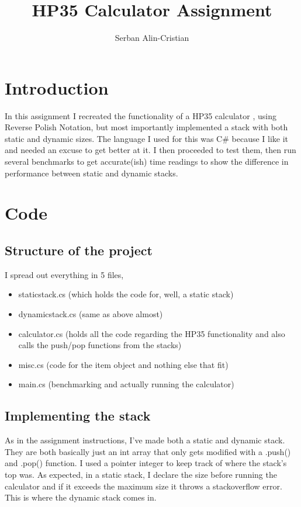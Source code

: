 \documentclass{article}
\title{HP35 Calculator Assignment}
\author{Serban Alin-Cristian}
\begin{document}
\maketitle



\section{Introduction}

In this assignment I recreated the functionality of a HP35 calculator , using Reverse Polish Notation, but most importantly implemented a stack with both static and dynamic sizes. The language I used for this was C# because I like it and needed an excuse to get better at it. I then proceeded to test them, then run several benchmarks to get accurate(ish) time readings to show the difference in performance between static and dynamic stacks. 

\section{Code}

\subsection{Structure of the project}

I spread out everything in 5 files,
\begin{itemize}
    \item staticstack.cs (which holds the code for, well, a static stack)
    \item dynamicstack.cs (same as above almost)
    \item calculator.cs (holds all the code regarding the HP35 functionality and also calls the push/pop functions from the stacks)
    \item misc.cs (code for the item object and nothing else that fit)
    \item main.cs (benchmarking and actually running the calculator)
\end{itemize}

\subsection{Implementing the stack}

As in the assignment instructions, I've made both a static and dynamic stack. They are both basically just an int array that only gets modified with a .push() and .pop() function. I used a pointer integer to keep track of where the stack's top was. As expected, in a static stack, I declare the size before running the calculator and if it exceeds the maximum size it throws a stackoverflow error. This is where the dynamic stack comes in. 
\end{document}
